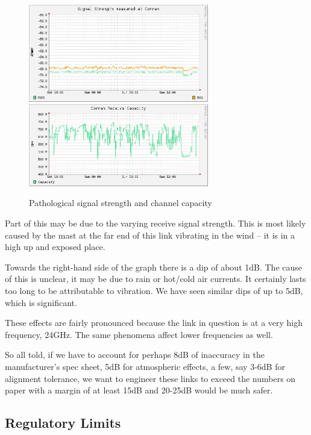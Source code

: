 \begin{figure}[h]
  \begin{center}
    \includegraphics[width=0.7\textwidth]{af24-cor-signal.png}
    \includegraphics[width=0.7\textwidth]{af24-cor-cap.png}
  \end{center}
  \caption{Pathological signal strength and channel capacity}
  \label{fig:thrashing}
\end{figure}

Part of this may be due to the varying receive signal strength. This
is most likely caused by the mast at the far end of this link
vibrating in the wind -- it is in a high up and exposed place.

Towards the right-hand side of the graph there is a dip of about
1dB. The cause of this is unclear, it may be due to rain or hot/cold
air currents. It certainly lasts too long to be attributable to
vibration. We have seen similar dips of up to 5dB, which is
significant. 

These effects are fairly pronounced because the link in question is at
a very high frequency, 24GHz. The same phenomena affect lower
frequencies as well.

So all told, if we have to account for perhaps 8dB of inaccuracy in
the manufacturer's spec sheet, 5dB for atmospheric effects, a few, say
3-6dB for alignment tolerance, we want to engineer these links to
exceed the numbers on paper with a margin of at least 15dB and 20-25dB
would be much safer.

\subsection{Regulatory Limits}
\label{sec:regulatory}

